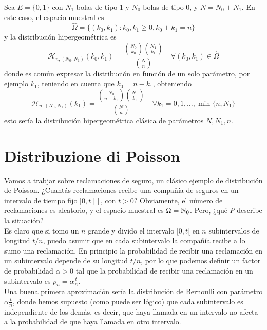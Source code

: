 \begin{ejemplo}
    Sea $E=\{0,1\}$ con $N_1$ bolas de tipo $1$ y $N_0$ bolas de tipo $0$, y $N=N_0+N_1$. En este caso, el espacio muestral es
    \begin{equation*}
        \hat{\Omega} = \{(k_0, k_1): k_0, k_1 \geq 0, k_0 + k_1 = n\}
    \end{equation*}
    y la distribución hipergeométrica es
    \begin{equation*}
        \mathcal{H}_{n, (N_0, N_1)}(k_0, k_1) = \dfrac{\binom{N_0}{k_0} \binom{N_1}{k_1}}{\binom{N}{n}} \quad \forall (k_0, k_1) \in \hat{\Omega}
    \end{equation*}
    donde es común expresar la distribución en función de un solo parámetro, por ejemplo $k_1$, teniendo en cuenta que $k_0=n-k_1$, obteniendo
    \begin{equation*}
        \mathcal{H}_{n, (N_0, N_1)}(k_1) = \dfrac{\binom{N_0}{n-k_1} \binom{N_1}{k_1}}{\binom{N}{n}} \quad \forall k_1=0, 1, \ldots, \min\{n, N_1\}
    \end{equation*}
    esto sería la distribución hipergeométrica clásica de parámetros $N, N_1, n$.
\end{ejemplo}

\section{Distribuzione di Poisson}

\begin{ejemplo}
    Vamos a trabjar sobre reclamaciones de seguro, un clásico ejemplo de distribución de Poisson. ¿Cuantás reclamaciones recibe una compañía de seguros en un intervalo de tiempo fijo $[0,t[]$, con $t>0$? Obviamente, el número de reclamaciones es aleatorio, y el espacio muestral es $\Omega =\mathbb{N}_0$. Pero, ¿qué $P$ describe la situación? \\

    \noindent
    Es claro que si tomo un $n$ grande y divido el intervalo $[0,t[$ en $n$ subintervalos de longitud $t/n$, puedo asumir que en cada subintervalo la compañía recibe a lo sumo una reclamación. En principio la probabilidad de recibir una reclamación en un subintervalo depende de su longitud $t/n$, por lo que podemos definir un factor de probabilidad $\alpha>0$ tal que la probabilidad de recibir una reclamación en un subintervalo es $p_n = \alpha \frac{t}{n}$. \\
    
    \noindent
    Una buena primera aproximación sería la distribución de Bernoulli con parámetro $\alpha \frac{t}{n}$, donde hemos supuesto (como puede ser lógico) que cada subintervalo es independiente de los demás, es decir, que haya llamada en un intervalo no afecta a la probabilidad de que haya llamada en otro intervalo. 
\end{ejemplo}


